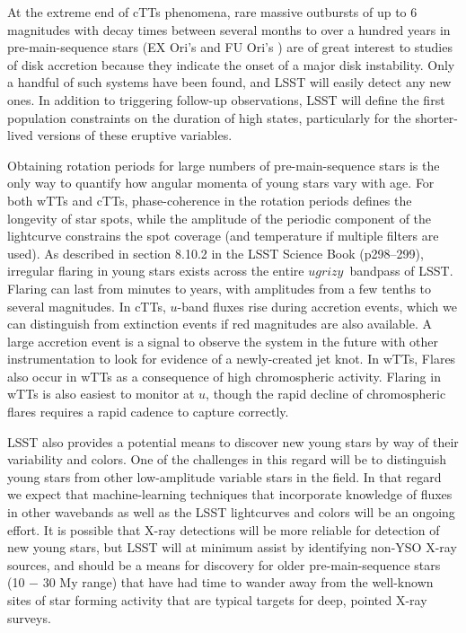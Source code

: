 At the extreme end of cTTs phenomena, rare massive
outbursts of up to 6 magnitudes with decay times between several months
to over a hundred years in pre-main-sequence stars (EX Ori's \citep{herbig01}
and FU Ori's \citep{hartmann96})
are of great interest to studies of disk accretion because they indicate the onset of
a major disk instability. Only a handful of such systems have been found, and LSST
will easily detect any new ones.  In addition to triggering
follow-up observations, LSST will define the first population
constraints on the duration of high states, particularly for the shorter-lived
versions of these eruptive variables.

Obtaining rotation periods for large numbers of pre-main-sequence stars is the only way to
quantify how angular momenta of young stars vary with age. For both wTTs and cTTs,
phase-coherence in the rotation periods defines the longevity of star spots, while the
amplitude of the periodic component of the lightcurve constrains the spot coverage (and
temperature if multiple filters are used).  As described in section 8.10.2 in the
LSST Science Book (p298--299), irregular flaring in young stars exists across the entire
$ugrizy$~bandpass of LSST. Flaring can last from minutes to years, with
amplitudes from a few tenths to several magnitudes.  In cTTs, $u$-band fluxes rise during
accretion events, which we can distinguish from extinction events if red magnitudes are
also available. A large accretion event is a signal to observe the system
in the future with other instrumentation to look for evidence of a newly-created
jet knot. In wTTs, Flares also occur in wTTs as a consequence of high chromospheric activity.
Flaring in wTTs is also easiest to monitor at $u$, though the rapid decline of
chromospheric flares requires a rapid cadence to capture correctly.

LSST also provides a potential means to discover new young stars by way of
their variability and colors. One of the challenges in this regard will be to
distinguish young stars from other low-amplitude variable stars in the field.
In that regard we expect that machine-learning techniques that incorporate knowledge of
fluxes in other wavebands as well as the LSST lightcurves and colors will
be an ongoing effort. It is possible that X-ray detections will be more
reliable for detection of new young stars, but LSST will at minimum assist
by identifying non-YSO X-ray sources, and should be a means for discovery
for older pre-main-sequence stars (10 $-$ 30 My range) that have had time
to wander away from the well-known sites of star forming activity that are
typical targets for deep, pointed X-ray surveys.

